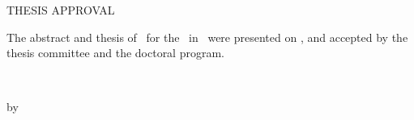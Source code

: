 \pagestyle{empty}  %



\long{}

 \begin{center} THESIS APPROVAL \end{center}
        \noindent The abstract and thesis of \thesisAuthor~for 
        the \thesisDegree~in \thesisDept~were presented on \thesisDate,
        and accepted by the thesis committee and the doctoral program.        

    \signature{COMMITTEE APPROVALS:}\thesisAdvisor    
    \signature{\ }\thesisCommitteeOne
    \signature{\ }\thesisCommitteeTwo

\clearpage  %
    
\begin{center}
  ~\\
  \thesisTitle
\end{center}

\vfill\vfill

\begin{center}
  by\\
  \thesisAuthor
\end{center}

\vfill

